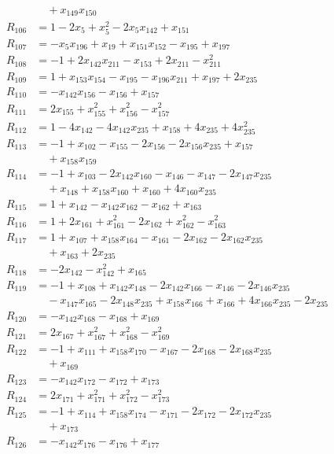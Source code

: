 \begin{align*}
&\quad{}+x_{149}x_{150}\\
R_{106}&=1-2x_{5}+x_{5}^{2}-2x_{5}x_{142}+x_{151}\\
R_{107}&=-x_{5}x_{196}+x_{19}+x_{151}x_{152}-x_{195}+x_{197}\\
R_{108}&=-1+2x_{142}x_{211}-x_{153}+2x_{211}-x_{211}^{2}\\
R_{109}&=1+x_{153}x_{154}-x_{195}-x_{196}x_{211}+x_{197}+2x_{235}\\
R_{110}&=-x_{142}x_{156}-x_{156}+x_{157}\\
R_{111}&=2x_{155}+x_{155}^{2}+x_{156}^{2}-x_{157}^{2}\\
R_{112}&=1-4x_{142}-4x_{142}x_{235}+x_{158}+4x_{235}+4x_{235}^{2}\\
R_{113}&=-1+x_{102}-x_{155}-2x_{156}-2x_{156}x_{235}+x_{157}\\
&\quad{}+x_{158}x_{159}\\
R_{114}&=-1+x_{103}-2x_{142}x_{160}-x_{146}-x_{147}-2x_{147}x_{235}\\
&\quad{}+x_{148}+x_{158}x_{160}+x_{160}+4x_{160}x_{235}\\
R_{115}&=1+x_{142}-x_{142}x_{162}-x_{162}+x_{163}\\
R_{116}&=1+2x_{161}+x_{161}^{2}-2x_{162}+x_{162}^{2}-x_{163}^{2}\\
R_{117}&=1+x_{107}+x_{158}x_{164}-x_{161}-2x_{162}-2x_{162}x_{235}\\
&\quad{}+x_{163}+2x_{235}\\
R_{118}&=-2x_{142}-x_{142}^{2}+x_{165}\\
R_{119}&=-1+x_{108}+x_{142}x_{148}-2x_{142}x_{166}-x_{146}-2x_{146}x_{235}\\
&\quad{}-x_{147}x_{165}-2x_{148}x_{235}+x_{158}x_{166}+x_{166}+4x_{166}x_{235}-2x_{235}\\
R_{120}&=-x_{142}x_{168}-x_{168}+x_{169}\\
R_{121}&=2x_{167}+x_{167}^{2}+x_{168}^{2}-x_{169}^{2}\\
R_{122}&=-1+x_{111}+x_{158}x_{170}-x_{167}-2x_{168}-2x_{168}x_{235}\\
&\quad{}+x_{169}\\
R_{123}&=-x_{142}x_{172}-x_{172}+x_{173}\\
R_{124}&=2x_{171}+x_{171}^{2}+x_{172}^{2}-x_{173}^{2}\\
R_{125}&=-1+x_{114}+x_{158}x_{174}-x_{171}-2x_{172}-2x_{172}x_{235}\\
&\quad{}+x_{173}\\
R_{126}&=-x_{142}x_{176}-x_{176}+x_{177}\\

\end{align*}
